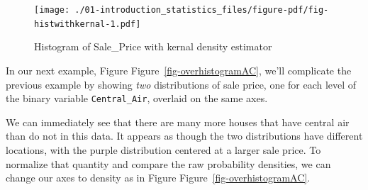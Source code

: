 \documentclass[
  letterpaper,
  DIV=11,
  numbers=noendperiod]{scrreprt}
\newenvironment{Shaded}{\begin{snugshade}}{\end{snugshade}}
\newcommand{\AttributeTok}[1]{\textcolor[rgb]{0.40,0.45,0.13}{#1}}
\newcommand{\DecValTok}[1]{\textcolor[rgb]{0.68,0.00,0.00}{#1}}
\newcommand{\FloatTok}[1]{\textcolor[rgb]{0.68,0.00,0.00}{#1}}
\newcommand{\FunctionTok}[1]{\textcolor[rgb]{0.28,0.35,0.67}{#1}}
\newcommand{\NormalTok}[1]{\textcolor[rgb]{0.00,0.23,0.31}{#1}}
\newcommand{\SpecialCharTok}[1]{\textcolor[rgb]{0.37,0.37,0.37}{#1}}
\newcommand{\StringTok}[1]{\textcolor[rgb]{0.13,0.47,0.30}{#1}}
\begin{document}
\begin{figure}[H]

{\centering \texttt{[image: ./01-introduction\_statistics\_files/figure-pdf/fig-histwithkernal-1.pdf]}

}

\caption{\label{fig-histwithkernal}Histogram of Sale\_Price with kernal
density estimator}

\end{figure}

In our next example, Figure Figure~\ref{fig-overhistogramAC}, we'll
complicate the previous example by showing \emph{two} distributions of
sale price, one for each level of the binary variable
\texttt{Central\_Air}, overlaid on the same axes.

We can immediately see that there are many more houses that have central
air than do not in this data. It appears as though the two distributions
have different locations, with the purple distribution centered at a
larger sale price. To normalize that quantity and compare the raw
probability densities, we can change our axes to density as in Figure
Figure~\ref{fig-overhistogramAC}.

\begin{Shaded}
\end{Shaded}
\end{document}

